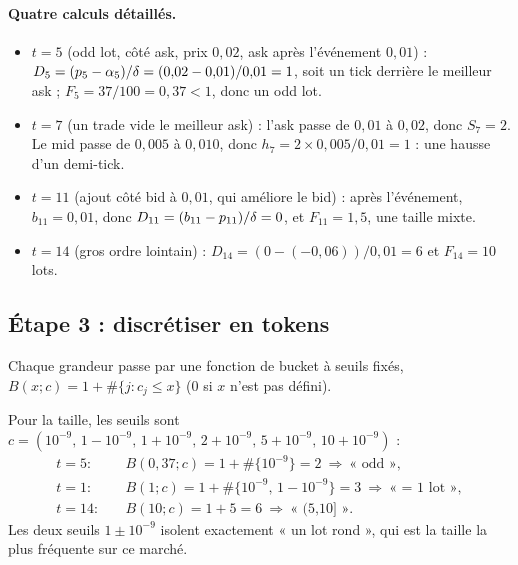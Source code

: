 \paragraph{Quatre calculs détaillés.}
\begin{itemize}
\item \textbf{$t=5$} (odd lot, côté ask, prix $0{,}02$, ask après l'événement $0{,}01$) :
$D_5=(p_5-\alpha_5)/\delta=(0{,}02-0{,}01)/0{,}01=1$, soit un tick derrière le meilleur ask ; $F_5=37/100=0{,}37<1$, donc un odd lot.
\item \textbf{$t=7$} (un trade vide le meilleur ask) : l'ask passe de $0{,}01$ à $0{,}02$, donc $S_7=2$. Le mid passe de $0{,}005$ à $0{,}010$, donc $h_7=2\times0{,}005/0{,}01=1$ : une hausse d'un demi-tick.
\item \textbf{$t=11$} (ajout côté bid à $0{,}01$, qui améliore le bid) : après l'événement, $b_{11}=0{,}01$, donc $D_{11}=(b_{11}-p_{11})/\delta=0$, et $F_{11}=1{,}5$, une taille mixte.
\item \textbf{$t=14$} (gros ordre lointain) : $D_{14}=(0-(-0{,}06))/0{,}01=6$ et $F_{14}=10$ lots.
\end{itemize}

\subsection{Étape 3 : discrétiser en tokens}
Chaque grandeur passe par une fonction de bucket à seuils fixés, $B(x;c)=1+\#\{j:c_j\le x\}$ (0 si $x$ n'est pas défini).

Pour la taille, les seuils sont $c=(10^{-9},\,1-10^{-9},\,1+10^{-9},\,2+10^{-9},\,5+10^{-9},\,10+10^{-9})$ :
\begin{align*}
t=5:&\quad B(0{,}37;c)=1+\#\{10^{-9}\}=2\ \Rightarrow\ \text{« odd »},\\
t=1:&\quad B(1;c)=1+\#\{10^{-9},\,1-10^{-9}\}=3\ \Rightarrow\ \text{« = 1 lot »},\\
t=14:&\quad B(10;c)=1+5=6\ \Rightarrow\ \text{« (5,10] »}.
\end{align*}
Les deux seuils $1\pm10^{-9}$ isolent exactement « un lot rond », qui est la taille la plus fréquente sur ce marché.

\begin{table}[H]\centering\scriptsize\setlength{\tabcolsep}{2.5pt}

\caption{Les onze tokens de chaque événement : l'indice d'abord, la signification entre parenthèses. Pour , « in » signifie « dans le spread », « = » « au meilleur » et « $+k$ » « $k$ ticks derrière ».}
\label{tab:extokens}
\end{table}

